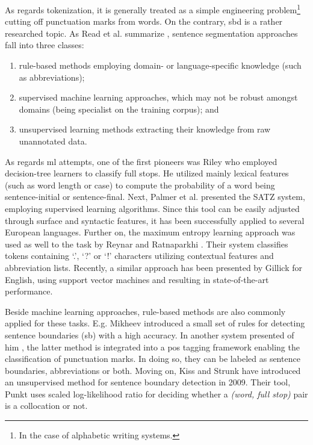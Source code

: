 As regards tokenization, it is generally treated as a simple engineering problem\footnote{In the case of alphabetic writing systems.} cutting off punctuation marks from words. 
On the contrary, \acrshort{sbd} is a rather researched topic. 
As Read et al. summarize \cite{read2012sentence}, sentence segmentation approaches fall into three classes: 
\begin{enumerate}
 \item rule-based methods employing domain- or language-specific knowledge (such as abbreviations); 
 \item supervised machine learning approaches, which may not be robust amongst domains (being specialist on the training corpus); and
 \item unsupervised learning methods extracting their knowledge from raw unannotated data. 
\end{enumerate}

As regards \acrshort{ml} attempts, one of the first pioneers was Riley \cite{riley1989some} who employed decision-tree learners to classify full stops. 
He utilized mainly lexical features (such as word length or case) to compute the probability of a word being sentence-initial or sentence-final. 
Next, Palmer et al. presented \cite{palmer1997adaptive} the SATZ system, employing supervised learning algorithms. 
Since this tool can be easily adjusted through surface and syntactic features, it has been successfully applied to several European languages. 
Further on, the maximum entropy learning approach was used as well to the task by Reynar and Ratnaparkhi \cite{reynar1997maximum}. 
Their system classifies tokens containing `.', `?' or `!' characters utilizing contextual features and abbreviation lists. 
Recently, a similar approach has been presented by Gillick \cite{gillick2009sentence} for English, using support vector machines and resulting in state-of-the-art performance.

Beside machine learning approaches, rule-based methods are also commonly applied for these tasks. 
E.g. Mikheev introduced \cite{mikheev2002periods} a small set of rules for detecting sentence boundaries (\acrshort{sb}) with a high accuracy. 
In another system presented of him \cite{mikheev2000tagging}, the latter method is integrated into a \acrshort{pos} tagging framework enabling the classification of punctuation marks. 
In doing so, they can be labeled as sentence boundaries, abbreviations or both. 
Moving on, Kiss and Strunk have introduced \cite{kiss2006unsupervised} an unsupervised method for sentence boundary detection in 2009. 
Their tool, Punkt uses scaled log-likelihood ratio for deciding whether a \emph{(word, full stop)} pair is a collocation or not.

